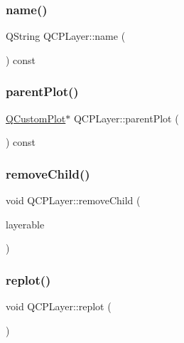 \subsubsection{\texorpdfstring{name()}{name()}}
{\footnotesize\ttfamily Q\+String Q\+C\+P\+Layer\+::name (\begin{DoxyParamCaption}{ }\end{DoxyParamCaption}) const\hspace{0.3cm}{\ttfamily [inline]}}

\mbox{\label{class_q_c_p_layer_a5520019787482e13857ebe631c27c3fa}} 
\subsubsection{\texorpdfstring{parentPlot()}{parentPlot()}}
{\footnotesize\ttfamily \mbox{\hyperlink{class_q_custom_plot}{Q\+Custom\+Plot}}$\ast$ Q\+C\+P\+Layer\+::parent\+Plot (\begin{DoxyParamCaption}{ }\end{DoxyParamCaption}) const\hspace{0.3cm}{\ttfamily [inline]}}

\mbox{\label{class_q_c_p_layer_ac2f64ac7761650582d968d86670ef362}} 
\subsubsection{\texorpdfstring{removeChild()}{removeChild()}}
{\footnotesize\ttfamily void Q\+C\+P\+Layer\+::remove\+Child (\begin{DoxyParamCaption}\item[{\mbox{\hyperlink{class_q_c_p_layerable}{Q\+C\+P\+Layerable}} $\ast$}]{layerable }\end{DoxyParamCaption})\hspace{0.3cm}{\ttfamily [protected]}}

\mbox{\label{class_q_c_p_layer_adefd53b6db02f470151c416f42e37180}} 
\subsubsection{\texorpdfstring{replot()}{replot()}}
{\footnotesize\ttfamily void Q\+C\+P\+Layer\+::replot (\begin{DoxyParamCaption}{ }\end{DoxyParamCaption})}

